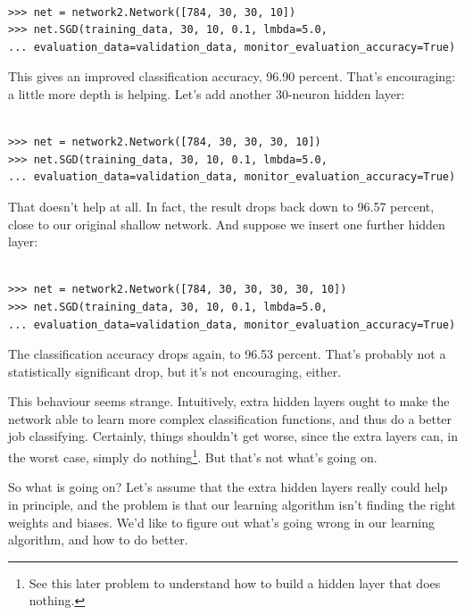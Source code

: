 \documentclass[a4paper,twoside,10pt]{book}
\begin{document}
\begin{lstlisting}

>>> net = network2.Network([784, 30, 30, 10])
>>> net.SGD(training_data, 30, 10, 0.1, lmbda=5.0, 
... evaluation_data=validation_data, monitor_evaluation_accuracy=True)

\end{lstlisting}
This gives an improved classification accuracy, 96.90 percent. That's encouraging: a little more depth is helping. Let's add another 30-neuron hidden layer:

\begin{lstlisting}

>>> net = network2.Network([784, 30, 30, 30, 10])
>>> net.SGD(training_data, 30, 10, 0.1, lmbda=5.0, 
... evaluation_data=validation_data, monitor_evaluation_accuracy=True)

\end{lstlisting}
That doesn't help at all. In fact, the result drops back down to 96.57 percent, close to our original shallow network. And suppose we insert one further hidden layer:

\begin{lstlisting}

>>> net = network2.Network([784, 30, 30, 30, 30, 10])
>>> net.SGD(training_data, 30, 10, 0.1, lmbda=5.0, 
... evaluation_data=validation_data, monitor_evaluation_accuracy=True)

\end{lstlisting}
The classification accuracy drops again, to 96.53 percent. That's probably not a statistically significant drop, but it's not encouraging, either.

This behaviour seems strange. Intuitively, extra hidden layers ought to make the network able to learn more complex classification functions, and thus do a better job classifying. Certainly, things shouldn't get worse, since the extra layers can, in the worst case, simply do nothing\footnote{See this later problem to understand how to build a hidden layer that does nothing.}. But that's not what's going on.

So what is going on? Let's assume that the extra hidden layers really could help in principle, and the problem is that our learning algorithm isn't finding the right weights and biases. We'd like to figure out what's going wrong in our learning algorithm, and how to do better.
\end{document}
